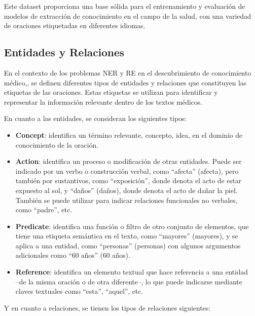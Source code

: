 \documentclass[10pt]{article} %
\begin{document}
	Este dataset proporciona una base sólida para el entrenamiento y evaluación de modelos de extracción de conocimiento en el campo de la salud, con una variedad de oraciones etiquetadas en diferentes idiomas.
	
	\subsection*{Entidades y Relaciones}\label{etiquetas}
	
	En el contexto de los problemas NER y RE en el descubrimiento de conocimiento médico,, se definen diferentes tipos de entidades y relaciones que constituyen las etiquetas de las oraciones. Estas etiquetas se utilizan para identificar y representar la información relevante dentro de los textos médicos.
	
	En cuanto a las entidades, se consideran los siguientes tipos:
	\begin{itemize}
		\item \textbf{Concept}: identifica un término relevante, concepto, idea, en el dominio de conocimiento de la oración.
		\item \textbf{Action}: identifica un proceso o modificación de otras entidades. Puede ser indicado por un verbo o construcción verbal, como “afecta” (afecta), pero también por sustantivos, como “exposición”, donde denota el acto de estar expuesto al sol, y “daños” (daños), donde denota el acto de dañar la piel. También se puede utilizar para indicar relaciones funcionales no verbales, como “padre”, etc.
		\item \textbf{Predicate}: identifica una función o filtro de otro conjunto de elementos, que tiene una etiqueta semántica en el texto, como “mayores” (mayores), y se aplica a una entidad, como “personas” (personas) con algunos argumentos adicionales como “60 años” (60 años).
		\item \textbf{Reference}: identifica un elemento textual que hace referencia a una entidad –de la misma oración o de otra diferente–, lo que puede indicarse mediante claves textuales como “esta”, “aquel”, etc.
	\end{itemize}
	
	Y en cuanto a relaciones, se tienen los tipos de relaciones siguientes:
	
\end{document}
